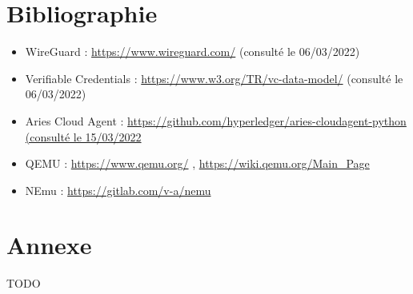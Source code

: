 \documentclass[12pt, openany]{report}
\begin{document}
\section{Bibliographie}
\noindent 
\begin{itemize}

\item WireGuard : \url{https://www.wireguard.com/} (consulté le 06/03/2022) 
\item Verifiable Credentials : \url{https://www.w3.org/TR/vc-data-model/} (consulté le 06/03/2022) 
\item Aries Cloud Agent : \url{https://github.com/hyperledger/aries-cloudagent-python (consulté le 15/03/2022} 
\item QEMU : \url{https://www.qemu.org/} , \url{https://wiki.qemu.org/Main_Page}
\item NEmu : \url{https://gitlab.com/v-a/nemu}

\end{itemize}

\section{Annexe}
\noindent 
\begin{flushleft}
TODO
\end{flushleft}
\end{document}
